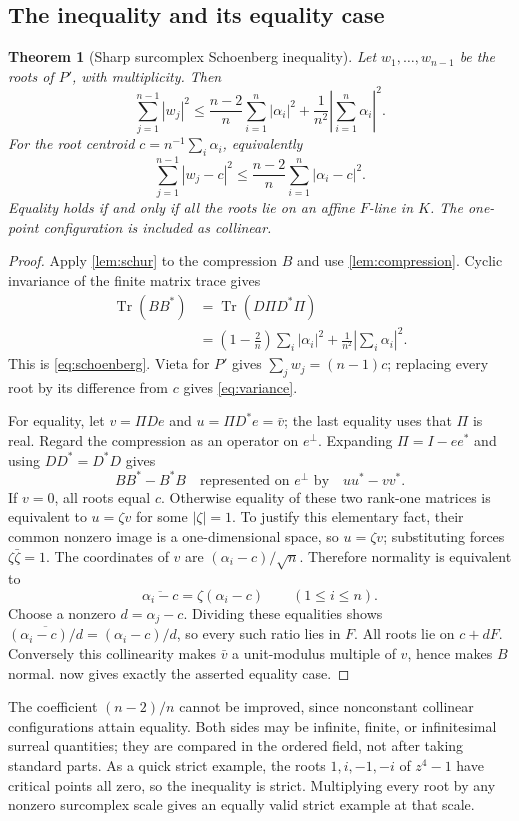 \documentclass[11pt,letterpaper]{article}
\numberwithin{equation}{section}
\newtheorem{theorem}{Theorem}[section]
\theoremstyle{definition}
\theoremstyle{remark}\newtheorem{remark}[theorem]{Remark}
\newcommand{\Tr}{\operatorname{Tr}}
\begin{document}
\subsection{The inequality and its equality case}
\begin{theorem}[Sharp surcomplex Schoenberg inequality]\label{thm:schoenberg}
Let $w_1,\ldots,w_{n-1}$ be the roots of $P'$, with multiplicity.
Then
\begin{equation}\label{eq:schoenberg}
 \sum_{j=1}^{n-1}|w_j|^2
 \le \frac{n-2}{n}\sum_{i=1}^n|\alpha_i|^2
    +\frac1{n^2}\left|\sum_{i=1}^n\alpha_i\right|^2.
\end{equation}
For the root centroid $c=n^{-1}\sum_i\alpha_i$, equivalently
\begin{equation}\label{eq:variance}
 \boxed{\displaystyle
 \sum_{j=1}^{n-1}|w_j-c|^2
 \le\frac{n-2}{n}\sum_{i=1}^n|\alpha_i-c|^2.}
\end{equation}
Equality holds if and only if all the roots lie on an affine $F$-line
in $K$. The one-point configuration is included as collinear.
\end{theorem}
\begin{proof}
Apply \cref{lem:schur} to the compression $B$ and use
\cref{lem:compression}. Cyclic invariance of the finite matrix trace gives
\begin{align*}
 \Tr(BB^*)&=\Tr(D\Pi D^*\Pi)\\
 &=\left(1-\frac2n\right)\sum_i|\alpha_i|^2
     +\frac1{n^2}\left|\sum_i\alpha_i\right|^2.
\end{align*}
This is \eqref{eq:schoenberg}. Vieta for $P'$ gives
$\sum_jw_j=(n-1)c$; replacing every root by its difference from $c$
gives \eqref{eq:variance}.

For equality, let $v=\Pi De$ and $u=\Pi D^*e=\bar v$; the last equality
uses that $\Pi$ is real. Regard the compression as an operator on
$e^\perp$. Expanding $\Pi=I-ee^*$ and using $DD^*=D^*D$ gives
\[
 BB^*-B^*B\quad\text{represented on }e^\perp\text{ by}\quad uu^*-vv^*.
\]
If $v=0$, all roots equal $c$. Otherwise equality of these two rank-one
matrices is equivalent to $u=\zeta v$ for some $|\zeta|=1$. To justify
this elementary fact, their common nonzero image is a one-dimensional
space, so $u=\zeta v$; substituting forces $\zeta\bar\zeta=1$.
The coordinates of $v$ are $(\alpha_i-c)/\sqrt n$. Therefore normality
is equivalent to
\[
 \overline{\alpha_i-c}=\zeta(\alpha_i-c)\qquad(1\le i\le n).
\]
Choose a nonzero $d=\alpha_j-c$. Dividing these equalities shows
$\overline{(\alpha_i-c)/d}=(\alpha_i-c)/d$, so every such ratio lies
in $F$. All roots lie on $c+dF$. Conversely this collinearity makes
$\bar v$ a unit-modulus multiple of $v$, hence makes $B$ normal.
 now gives exactly the asserted equality case.
\end{proof}
The coefficient $(n-2)/n$ cannot be improved, since nonconstant collinear
configurations attain equality. Both sides may be infinite, finite, or
infinitesimal surreal quantities; they are compared in the ordered field,
not after taking standard parts. As a quick strict example, the roots
$1,i,-1,-i$ of $z^4-1$ have critical points all zero, so the inequality
is strict. Multiplying every root by any nonzero surcomplex scale gives
an equally valid strict example at that scale.
\end{document}
